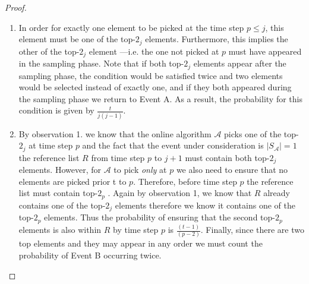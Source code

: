\begin{proof}
\begin{enumerate}[label={\bf Observation \arabic*:}, topsep=0pt, parsep=0pt, leftmargin=69pt, itemsep=2pt]
    \item  In order for exactly one element to be picked at the time step $p \leq j$, this element must be one of the top-$2_j$ elements. Furthermore, this implies the other of the top-$2_j$ element ---i.e. the one not picked at $p$ must have appeared in the sampling phase. Note that if both top-$2_j$ elements appear after the sampling phase, the condition would be satisfied twice and two elements would be selected instead of exactly one, and if they both appeared during the sampling phase we return to Event A. As a result, the probability for this condition is given by $\frac{t}{j (j - 1)}$.  
    \item By observation 1. we know that the online algorithm $\mathcal{A}$ picks one of the top-$2_j$ at time step $p$ and the fact that the event under consideration is $|S_{\mathcal{A}}|=1$ the reference list $R$ from time step $p$ to $j+1$ must contain both top-$2_j$ elements. However, for $\mathcal{A}$ to pick \emph{only} at $p$ we also need to ensure that no elements are picked prior t to $p$. Therefore, before time step $p$ the reference list must contain  top-$2_{p}$ . Again by observation 1, we know that $R$ already contains one of the top-$2_j$ elements therefore we know it contains one of the  top-$2_p$ elements. Thus the probability of ensuring that the second  top-$2_p$ elements is also within $R$ by time step $p$ is $\frac{(t - 1)}{(p - 2)}$. Finally, since there are two top elements and they may appear in any order we must count the probability of Event B occurring twice.

\end{enumerate}



\end{proof}

